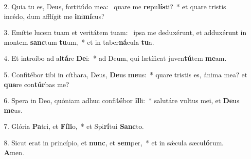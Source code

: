 2. Quia tu es, Deus, fortitúdo mea: \dag\  quare me \textbf{re}pu\textbf{lís}ti?~*  et quare tristis incédo, dum afflígit me \textbf{in}i\textbf{mí}cus?\

3. Emítte lucem tuam et veritátem tuam: \dag\  ipsa me deduxérunt, et adduxérunt in montem \textbf{sanc}tum \textbf{tu}um,~*  et in taber\textbf{ná}cula \textbf{tu}a.\

4. Et introíbo ad al\textbf{tá}re \textbf{De}i:~*  ad Deum, qui lætíficat juven\textbf{tú}tem \textbf{me}am.\

5. Confitébor tibi in cíthara, Deus, \textbf{De}us \textbf{me}us:~*  quare tristis es, ánima mea? et \textbf{qua}re con\textbf{túr}bas me?\

6. Spera in Deo, quóniam adhuc confi\textbf{té}bor \textbf{il}li:~*  salutáre vultus mei, et \textbf{De}us \textbf{me}us.\

7. Glória \textbf{Pa}tri, et \textbf{Fí}\textbf{li}o,~*  et Spi\textbf{rí}tui \textbf{Sanc}to.\

8. Sicut erat in princípio, et \textbf{nunc}, et \textbf{sem}per,~*  et in sǽcula sæcu\textbf{ló}rum. \textbf{A}men.\

